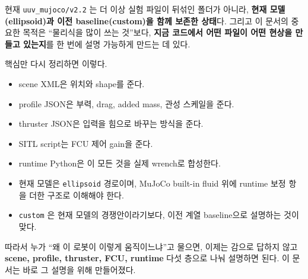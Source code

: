 \documentclass[11pt,a4paper]{article}
\newcommand{\code}[1]{\nolinkurl{#1}}
\begin{document}
현재 \code{uuv\_mujoco/v2.2} 는 더 이상 실험 파일이 뒤섞인 폴더가 아니라, \textbf{현재 모델(ellipsoid)과 이전 baseline(custom)을 함께 보존한 상태}다. 그리고 이 문서의 중요한 목적은 ``물리식을 많이 쓰는 것''보다, \textbf{지금 코드에서 어떤 파일이 어떤 현상을 만들고 있는지}를 한 번에 설명 가능하게 만드는 데 있다.

핵심만 다시 정리하면 이렇다.

\begin{itemize}[leftmargin=2em]
  \item scene XML은 위치와 shape를 준다.
  \item profile JSON은 부력, drag, added mass, 관성 스케일을 준다.
  \item thruster JSON은 입력을 힘으로 바꾸는 방식을 준다.
  \item SITL script는 FCU 제어 gain을 준다.
  \item runtime Python은 이 모든 것을 실제 wrench로 합성한다.
  \item 현재 모델은 \code{ellipsoid} 경로이며, MuJoCo built-in fluid 위에 runtime 보정 항을 더한 구조로 이해해야 한다.
  \item \code{custom} 은 현재 모델의 경쟁안이라기보다, 이전 계열 baseline으로 설명하는 것이 맞다.
\end{itemize}

따라서 누가 ``왜 이 로봇이 이렇게 움직이느냐''고 물으면, 이제는 감으로 답하지 않고 \textbf{scene, profile, thruster, FCU, runtime} 다섯 층으로 나눠 설명하면 된다. 이 문서는 바로 그 설명을 위해 만들어졌다.
\end{document}
